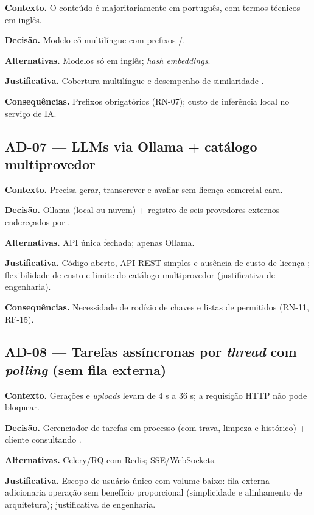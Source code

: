 \textbf{Contexto.} O conteúdo é majoritariamente em português, com termos técnicos em inglês.

\textbf{Decisão.} Modelo e5 multilíngue com prefixos \texttt{}/\texttt{}.

\textbf{Alternativas.} Modelos só em inglês; \emph{hash embeddings}.

\textbf{Justificativa.} Cobertura multilíngue e desempenho de similaridade \cite{reimers_gurevych_2019}.

\textbf{Consequências.} Prefixos obrigatórios (RN-07); custo de inferência local no serviço de IA.

\subsection{AD-07 --- LLMs via Ollama + catálogo multiprovedor}

\textbf{Contexto.} Precisa gerar, transcrever e avaliar sem licença comercial cara.

\textbf{Decisão.} Ollama (local ou nuvem) + registro de seis provedores externos endereçados por \texttt{}.

\textbf{Alternativas.} API única fechada; apenas Ollama.

\textbf{Justificativa.} Código aberto, API REST simples e ausência de custo de licença \cite{ollama_2025}; flexibilidade de custo e limite do catálogo multiprovedor (justificativa de engenharia).

\textbf{Consequências.} Necessidade de rodízio de chaves e listas de permitidos (RN-11, RF-15).

\subsection{AD-08 --- Tarefas assíncronas por \emph{thread} com \emph{polling} (sem fila externa)}

\textbf{Contexto.} Gerações e \emph{uploads} levam de 4 s a 36 s; a requisição HTTP não pode bloquear.

\textbf{Decisão.} Gerenciador de tarefas em processo (com trava, limpeza e histórico) + cliente consultando \texttt{}.

\textbf{Alternativas.} Celery/RQ com Redis; SSE/WebSockets.

\textbf{Justificativa.} Escopo de usuário único com volume baixo: fila externa adicionaria operação sem benefício proporcional \cite{sommerville_2015} (simplicidade e alinhamento de arquitetura); justificativa de engenharia.

